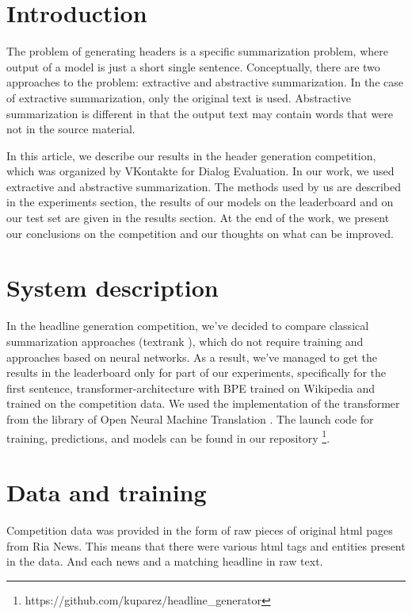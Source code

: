 \documentclass{dialogue}
\begin{document}

\section{Introduction}
The problem of generating headers is a specific summarization problem, where output of a model is just a short single sentence. Conceptually, there are two approaches to the problem: extractive and abstractive summarization. In the case of extractive summarization, only the original text is used. Abstractive summarization is different in that the output text may contain words that were not in the source material.

In this article, we describe our results in the header generation competition, which was organized by VKontakte for Dialog Evaluation. In our work, we used extractive and abstractive summarization. The methods used by us are described in the experiments section, the results of our models on the leaderboard and on our test set are given in the results section. At the end of the work, we present our conclusions on the competition and our thoughts on what can be improved.

\section{System description}
In the headline generation competition, we've decided to compare classical summarization approaches (textrank \cite{DBLP:journals/corr/BarriosLAW16}), which do not require training and approaches based on neural networks. As a result, we've managed to get the results in the leaderboard only for part of our experiments, specifically for the first sentence, transformer-architecture \cite{DBLP:journals/corr/VaswaniSPUJGKP17} with BPE trained on Wikipedia \cite{heinzerling2018bpemb} and trained on the competition data. We used the implementation of the transformer from the library of Open Neural Machine Translation \cite{2017opennmt}. The launch code for training, predictions, and models can be found in our repository \footnote{https://github.com/kuparez/headline\_generator}.

\section{Data and training}
Competition data was provided in the form of raw pieces of original html pages from Ria News. This means that there were various html tags and entities present in the data. And each news and a matching headline in raw text.
\end{document}
